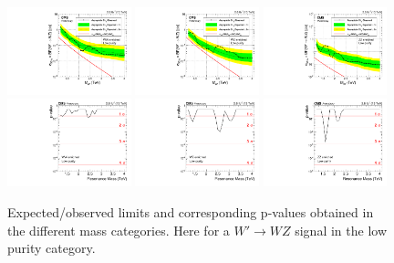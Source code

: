 \begin{figure}[h!]
\centering
\includegraphics[width=0.32\textwidth]{figures/analysis/search1/AN-15-211/limits/brazilianFlag_WZ_WWLP_13TeV_wPDF.pdf}
\includegraphics[width=0.32\textwidth]{figures/analysis/search1/AN-15-211/limits/brazilianFlag_WZ_WZLP_13TeV_wPDF.pdf}
\includegraphics[width=0.32\textwidth]{figures/analysis/search1/AN-15-211/limits/brazilianFlag_WZ_ZZLP_13TeV_wPDF.pdf}\\
\includegraphics[width=0.32\textwidth]{figures/analysis/search1/AN-15-211/pvalues/pvalue_WZinWW_low_purity.pdf}
\includegraphics[width=0.32\textwidth]{figures/analysis/search1/AN-15-211/pvalues/pvalue_WZinWZ_low_purity.pdf}
\includegraphics[width=0.32\textwidth]{figures/analysis/search1/AN-15-211/pvalues/pvalue_WZinZZ_low_purity.pdf}
\caption{Expected/observed limits and corresponding p-values obtained in the different mass categories. Here for a $W'\rightarrow WZ$ signal in the low purity category.}
\label{fig:searchI:Limits_LPWZ}
\end{figure}


